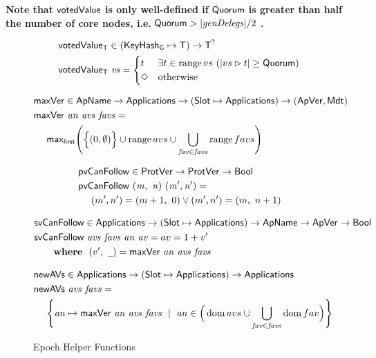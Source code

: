 \textbf{Note that} $\mathsf{votedValue}$
\textbf{is only well-defined if } $\mathsf{Quorum}$
\textbf{is greater than half the number of core nodes, i.e.}
$\mathsf{Quorum} > |\mathit{genDelegs}|/2$ \textbf{.}
\begin{figure}[htb]
  \begin{align*}
      & \mathsf{votedValue_T} \in (\mathsf{KeyHash_G}\mapsto\mathsf{T}) \to \mathsf{T}^?\\
      & \mathsf{votedValue_T}~\mathit{vs} =
        \begin{cases}
          t & \exists t\in\operatorname{range}{vs}~(|vs\rhd t|\geq \mathsf{Quorum}) \\
          \Diamond & \text{otherwise} \\
        \end{cases}
  \end{align*}

  \begin{align*}
      & \mathsf{maxVer} \in \mathsf{ApName} \to \mathsf{Applications} \to (\mathsf{Slot}\mapsto\mathsf{Applications})
        \to (\mathsf{ApVer}, \mathsf{Mdt})\\
      & \mathsf{maxVer}~\mathit{an}~\mathit{avs}~\mathit{favs} = \\
      & ~~~~\mathsf{max_{first}} \Bigg(
        \Big\{(0, \emptyset)\Big\}
        \cup
        \operatorname{range}{avs}
        \cup
        \bigcup_{\mathit{fav}\in\mathit{favs}}
        \operatorname{range}{favs}
        \Bigg)
  \end{align*}

  \begin{align*}
      & \mathsf{pvCanFollow} \in \mathsf{ProtVer} \to  \mathsf{ProtVer} \to \mathsf{Bool} \\
      & \mathsf{pvCanFollow}~\mathit{(m,~n)}~\mathit{(m', n')} = \\
      & ~~~~ (m', n') = (m+1,~0) \lor (m', n') = (m,~n+1) \\
  \end{align*}

  \begin{align*}
      & \fun{svCanFollow} \in \Applications \to (\Slot\mapsto\Applications)
        \to \ApName \to \ApVer \to \Bool\\
      & \fun{svCanFollow}~\var{avs}~\var{favs}~\var{an}~\var{av}= av = 1 + v' \\
      & ~~~~\where (v',~\wcard) = \fun{maxVer}~\var{an}~\var{avs}~\var{favs}
  \end{align*}

  \begin{align*}
      & \mathsf{newAVs} \in \mathsf{Applications} \to (\mathsf{Slot}\mapsto\mathsf{Applications}) \to \mathsf{Applications} \\
      & \mathsf{newAVs}~\mathit{avs}~\mathit{favs} = \\
      & ~~~~\Bigg\{\mathit{an}\mapsto\mathsf{maxVer}~\mathit{an}~\mathit{avs}~\mathit{favs}
            ~\mid~
            \mathit{an}\in\Big(\operatorname{dom}{avs}\cup\bigcup_{\mathit{fav}\in\mathit{favs}}\operatorname{dom}{fav}\Big)
            \Bigg\}
  \end{align*}

  \caption{Epoch Helper Functions}
  \label{fig:funcs:helper-updates}
\end{figure}

